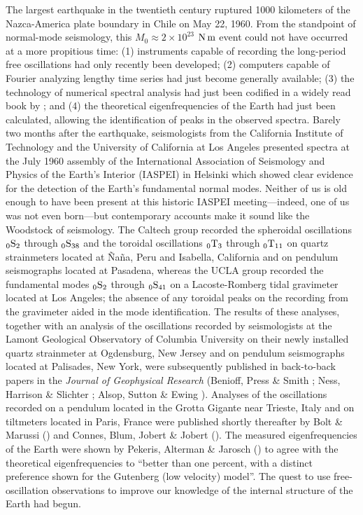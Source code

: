 The largest earthquake in the twentieth century
ruptured 1000 kilometers of the Nazca-America
plate boundary in Chile on May 22, 1960.
%
From the standpoint
of normal-mode seismology, this $M_0\approx 2\times 10^{23}$
${\rm N}\,{\rm m}$ event could not have occurred at a more propitious
time: (1) instruments capable of recording the long-period
free oscillations had only recently been developed;
(2) computers capable of Fourier analyzing
lengthy time series had just become generally available;
(3) the technology of numerical spectral analysis had just been
codified in a widely read book by \textcite{blackman&tukey58};
and (4) the theoretical eigenfrequencies of the Earth
had just been calculated, allowing the identification
of peaks in the observed spectra.  Barely two months after
the earthquake, seismologists from the California Institute
of Technology and the University of California
at Los Angeles presented spectra at the July 1960
assembly of the International Association of Seismology
and Physics of the Earth's Interior (IASPEI)
in Helsinki which showed clear evidence for the
detection of the Earth's fundamental normal modes.
Neither of us is old enough to have been
present at this historic IASPEI meeting---indeed,
one of us was not even born---but contemporary
accounts make it sound like the Woodstock of seismology.
The Caltech group recorded the spheroidal
oscillations ${}_0{\rm S}_2$ through
${}_0{\rm S}_{38}$ and the toroidal oscillations
${}_0{\rm T}_3$ through ${}_0{\rm T}_{11}$
on quartz strainmeters located at \~{N}a\~{n}a, Peru
and Isabella, California and on pendulum
seismographs located at Pasadena, whereas the UCLA group
recorded the fundamental modes ${}_0{\rm S}_2$ through
${}_0{\rm S}_{41}$ on a Lacoste-Romberg tidal gravimeter
located at Los Angeles; the absence of any toroidal peaks
on the recording from the gravimeter aided in the mode identification.
The results of these analyses, together with an analysis of the
oscillations recorded by seismologists at the Lamont Geological
Observatory of Columbia University on their newly installed
quartz strainmeter at Ogdensburg, New Jersey and on pendulum
seismographs located at Palisades, New York, were subsequently
published in back-to-back papers in the {\em Journal of Geophysical
Research\/} (Benioff, Press \& Smith \citeyear{benioff&al61};
Ness, Harrison \& Slichter \citeyear{ness&al61};
Alsop, Sutton \& Ewing \citeyear{alsop&al61}).
Analyses of the oscillations recorded on a pendulum
located in the Grotta Gigante near Trieste, Italy
and on tiltmeters located in Paris, France were published
shortly thereafter by Bolt \& Marussi (\citeyear{bolt&marussi62})
and Connes, Blum, Jobert \& Jobert (\citeyear{connes&al62}).
The measured eigenfrequencies of the Earth were shown
by Pekeris, Alterman \& Jarosch (\citeyear{pekeris&al61a})
to agree with the theoretical
eigenfrequencies to ``better than one percent, with a distinct
preference shown for the Gutenberg (low velocity) model''.
The quest to use free-oscillation observations to
improve our knowledge of the internal structure of the
Earth had begun.

